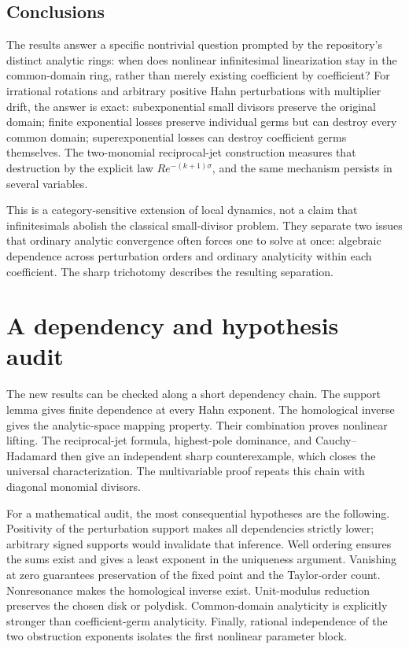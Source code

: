 \documentclass[11pt,a4paper]{article}
\numberwithin{equation}{section}
\theoremstyle{definition}
\theoremstyle{remark}
\begin{document}
\subsection{Conclusions}

The results answer a specific nontrivial question prompted by the
repository's distinct analytic rings: when does nonlinear infinitesimal
linearization stay in the common-domain ring, rather than merely existing
coefficient by coefficient? For irrational rotations and arbitrary
positive Hahn perturbations with multiplier drift, the answer is exact:
subexponential small divisors preserve the original domain; finite
exponential losses preserve individual germs but can destroy every common
domain; superexponential losses can destroy coefficient germs themselves.
The two-monomial reciprocal-jet construction measures that destruction
by the explicit law $Re^{-(k+1)\sigma}$, and the same mechanism persists
in several variables.

This is a category-sensitive extension of local dynamics, not a claim that
infinitesimals abolish the classical small-divisor problem. They separate
two issues that ordinary analytic convergence often forces one to solve
at once: algebraic dependence across perturbation orders and ordinary
analyticity within each coefficient. The sharp trichotomy describes the
resulting separation.

\appendix
\section{A dependency and hypothesis audit}\label{app:audit}

The new results can be checked along a short dependency chain.
The support lemma gives finite dependence at every Hahn exponent.
The homological inverse gives the analytic-space mapping property.
Their combination proves nonlinear lifting. The reciprocal-jet formula,
highest-pole dominance, and Cauchy--Hadamard then give an independent sharp
counterexample, which closes the universal characterization. The
multivariable proof repeats this chain with diagonal monomial divisors.

For a mathematical audit, the most consequential hypotheses are the
following. Positivity of the perturbation support makes all dependencies
strictly lower; arbitrary signed supports would invalidate that inference.
Well ordering ensures the sums exist and gives a least exponent in the
uniqueness argument. Vanishing at zero guarantees preservation of the
fixed point and the Taylor-order count. Nonresonance makes the homological
inverse exist. Unit-modulus reduction preserves the chosen disk or
polydisk. Common-domain analyticity is explicitly stronger than
coefficient-germ analyticity. Finally, rational independence of the two
obstruction exponents isolates the first nonlinear parameter block.
\end{document}
